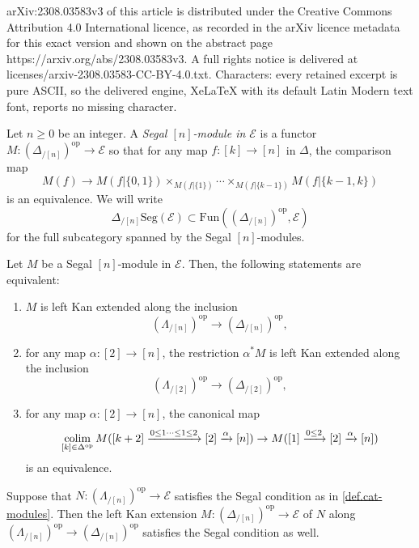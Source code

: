 \documentclass[10pt,a4paper]{amsart}
\def\colim{\qopname\relax m{colim}}
\newcommand{\E}{\mathscr{E}}
\newcommand{\Seg}{\mathrm{Seg}}
\newcommand{\fun}{\mathrm{Fun}}
\newcommand{\op}{\mathrm{op}}
\begin{document}
arXiv:2308.03583v3 of this article is distributed under the Creative Commons Attribution 4.0 International licence, as recorded in the arXiv licence metadata for this exact version and shown on the abstract page https://arxiv.org/abs/2308.03583v3. A full rights notice is delivered at licenses/arxiv-2308.03583-CC-BY-4.0.txt. Characters: every retained excerpt is pure ASCII, so the delivered engine, XeLaTeX with its default Latin Modern text font, reports no missing character.
\begin{definition}\label{def.cat-modules}
	Let $n \geq 0$ be an integer.
	 A \textit{Segal $[n]$-module in $\E$} 
	is a functor 
	$
	M : (\Delta_{/[n]})^\op \rightarrow \E 
	$
	so that for any map $f : [k] \rightarrow [n]$ in $\Delta$, the comparison map
	$$
	M(f) \rightarrow M(f|\{0,1\}) \times_{M(f|\{1\})} \dotsb \times_{M(f|\{k-1\})} M(f|\{k-1,k\})
	$$
	is an equivalence. We will write 
	$$
	{\Delta_{/[n]}}\Seg(\E) \subset \fun((\Delta_{/[n]})^\op, \E)
	$$
	for the full subcategory spanned by the Segal $[n]$-modules.
\end{definition}

\begin{proposition}\label{prop.conduche-modules}
	Let $M$ be a Segal $[n]$-module in $\E$. Then, the following statements are equivalent: 
	\begin{enumerate}
		\item $M$ is left Kan extended along the inclusion $$(\Lambda_{/[n]})^\op \rightarrow (\Delta_{/[n]})^\op,$$
		\item for any map $\alpha : [2] \rightarrow [n]$, the restriction $\alpha^*M$ is left Kan extended along the inclusion 
		$$(\Lambda_{/[2]})^\op \rightarrow (\Delta_{/[2]})^\op,$$
		\item for any map $\alpha : [2] \rightarrow [n]$, the canonical map 
		$$
		\colim_{[k] \in \Delta^\op} M([k+2] \xrightarrow{0 \leq 1 \dotsb \leq 1\leq 2} [2] \xrightarrow{\alpha}
		 [n]) \rightarrow M([1] \xrightarrow{0\leq 2} [2] \xrightarrow{\alpha} [n])
		$$
		is an equivalence.
	\end{enumerate}
\end{proposition}

\begin{lemma}\label{lemma.conduche-modules-kan-extension}
	Suppose that $N : (\Lambda_{/[n]})^\op \rightarrow \E$ satisfies the Segal condition as in \cref{def.cat-modules}. Then 
	the left Kan extension $M : (\Delta_{/[n]})^\op \rightarrow \E$ of $N$ along $(\Lambda_{/[n]})^\op \rightarrow (\Delta_{/[n]})^\op$ satisfies the Segal condition as well.
\end{lemma}
\end{document}
